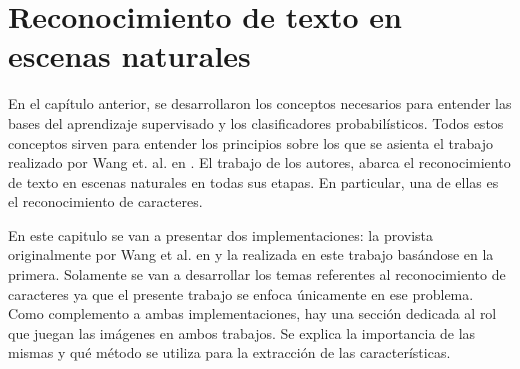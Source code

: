 \newpage	
\section{Reconocimiento de texto en escenas naturales}

	En el capítulo anterior, se desarrollaron los conceptos necesarios para entender las bases del aprendizaje supervisado y los clasificadores probabilísticos. Todos estos conceptos sirven para entender los principios sobre los que se asienta el trabajo realizado por Wang et. al. en \cite{wang}. El trabajo de los autores, abarca el reconocimiento de texto en escenas naturales en todas sus etapas. En particular, una de ellas es el reconocimiento de caracteres.
	
	En este capitulo se van a presentar dos implementaciones: la provista originalmente por Wang et al. en \cite{wang} y la realizada en este trabajo basándose en la primera. Solamente se van a desarrollar los temas referentes al reconocimiento de caracteres ya que el presente trabajo se enfoca únicamente en ese problema. Como complemento a ambas implementaciones, hay una sección dedicada al rol que juegan las imágenes en ambos trabajos. Se explica la importancia de las mismas y qué método se utiliza para la extracción de las características.
	
	
		
	
	
	
	
	
	
